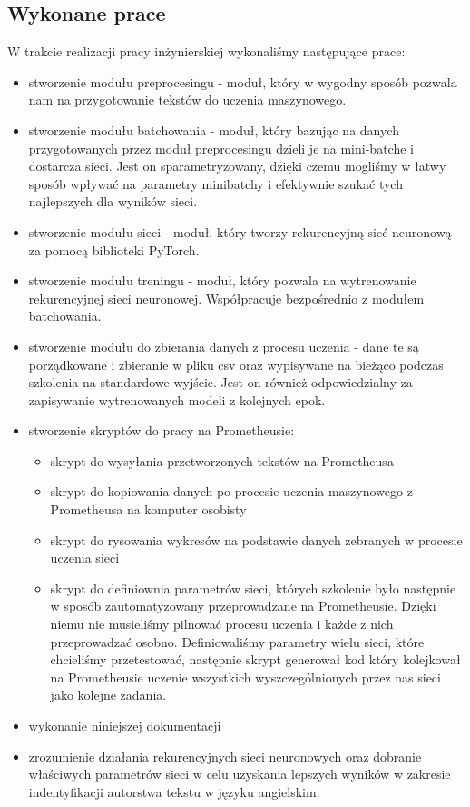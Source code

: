 \subsection{Wykonane prace}
W trakcie realizacji pracy inżynierskiej wykonaliśmy następujące prace:
\begin{itemize}
  \item stworzenie modułu preprocesingu - moduł, który w wygodny sposób pozwala nam na przygotowanie tekstów 
  do uczenia maszynowego. 
  \item stworzenie modułu batchowania - moduł, który bazując na danych przygotowanych przez moduł 
  preprocesingu dzieli je na mini-batche i dostarcza sieci. Jest on sparametryzowany, dzięki czemu mogliśmy
  w łatwy sposób wpływać na parametry minibatchy i efektywnie szukać tych najlepszych dla wyników sieci. 
  \item stworzenie modułu sieci - moduł, który tworzy rekurencyjną sieć neuronową za pomocą
  biblioteki PyTorch.
  \item stworzenie modułu treningu - moduł, który pozwala na wytrenowanie rekurencyjnej sieci neuronowej. 
  Współpracuje bezpośrednio z modułem batchowania.
  \item stworzenie modułu do zbierania danych z procesu uczenia - dane te są porządkowane i 
  zbieranie w pliku csv oraz wypisywane na bieżąco podczas szkolenia na standardowe wyjście. 
  Jest on również odpowiedzialny za zapisywanie wytrenowanych modeli z kolejnych epok. 
  \item stworzenie skryptów do pracy na Prometheusie:
  \begin{itemize}
    \item skrypt do wysyłania przetworzonych tekstów na Prometheusa 
    \item skrypt do kopiowania danych po procesie uczenia maszynowego z Prometheusa na komputer osobisty
    \item skrypt do rysowania wykresów na podstawie danych zebranych w procesie uczenia sieci
    \item skrypt do definiownia parametrów sieci, których szkolenie było następnie w sposób zautomatyzowany
     przeprowadzane na Prometheusie. Dzięki niemu nie musieliśmy pilnować procesu uczenia i 
   	każde z nich przeprowadzać osobno. Definiowaliśmy parametry wielu sieci, które chcieliśmy przetestować,
   	następnie skrypt generował kod który kolejkował na Prometheusie uczenie wszystkich wyszczególnionych przez nas sieci 
   	jako kolejne zadania.
  \end{itemize}
  \item wykonanie niniejszej dokumentacji
  \item zrozumienie działania rekurencyjnych sieci neuronowych oraz dobranie właściwych parametrów sieci 
  w celu uzyskania lepszych wyników w zakresie indentyfikacji autorstwa tekstu w języku angielskim.
\end{itemize}


